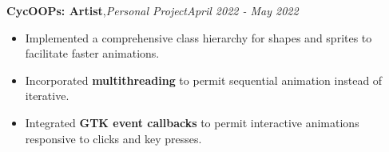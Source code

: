 \textbf{CycOOPs: Artist}\sep{\it Personal Project}\hfill{\sl \small April 2022 - May 2022}\\
\vspace{-8pt}
\begin{itemize}[itemsep = -1.7 mm, leftmargin=*]
\item Implemented a comprehensive class hierarchy for shapes and sprites to facilitate faster animations.
\item Incorporated \textbf{multithreading} to permit sequential animation instead of iterative.
\item Integrated \textbf{GTK event callbacks} to permit interactive animations responsive to clicks and key presses.
\end{itemize}
